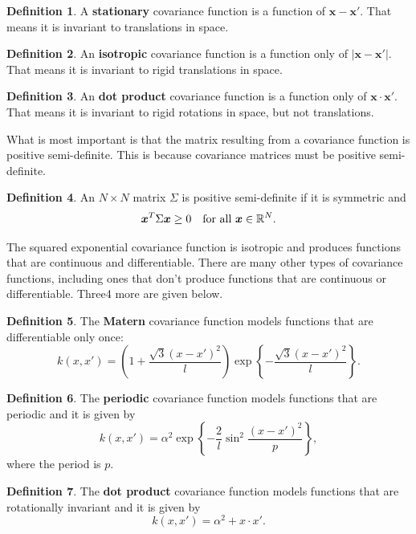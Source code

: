 \documentclass[
]{book}
\theoremstyle{definition}
\newtheorem{definition}{Definition}[chapter]
\theoremstyle{definition}
\theoremstyle{definition}
\theoremstyle{definition}
\theoremstyle{remark}
\begin{document}
\begin{definition}
A \textbf{stationary} covariance function is a function of \(\boldsymbol{x} - \boldsymbol{x}'\). That means it is invariant to translations in space.
\end{definition}

\begin{definition}
An \textbf{isotropic} covariance function is a function only of \(|\boldsymbol{x} - \boldsymbol{x}'|\). That means it is invariant to rigid translations in space.
\end{definition}

\begin{definition}
An \textbf{dot product} covariance function is a function only of \(\boldsymbol{x}\cdot\boldsymbol{x}'\). That means it is invariant to rigid rotations in space, but not translations.
\end{definition}

What is most important is that the matrix resulting from a covariance function is positive semi-definite. This is because covariance matrices must be positive semi-definite.

\begin{definition}
An \(N \times N\) matrix \(\Sigma\) is positive semi-definite if it is symmetric and
\[
\boldsymbol{x}^T\Sigma\boldsymbol{x} \geq 0 \quad \hbox{for all } \boldsymbol{x} \in \mathbb{R}^N.
\]
\end{definition}

The squared exponential covariance function is isotropic and produces functions that are continuous and differentiable. There are many other types of covariance functions, including ones that don't produce functions that are continuous or differentiable. Three4 more are given below.

\begin{definition}
The \textbf{M\textquotesingle atern} covariance function models functions that are differentiable only once:
\[
k(x, x') = \left(1 + \frac{\sqrt{3}(x - x')^2}{l} \right)\exp\left\{-\frac{\sqrt{3}(x - x')^2}{l} \right\}.
\]
\end{definition}

\begin{definition}
The \textbf{periodic} covariance function models functions that are periodic and it is given by
\[
k(x, x') = \alpha^2 \exp\left\{-\frac{2}{l}\sin^2\frac{(x-x')^2}{p} \right\},
\]
where the period is \(p\).
\end{definition}

\begin{definition}
The \textbf{dot product} covariance function models functions that are rotationally invariant and it is given by
\[
k(x, x') = \alpha^2 + x\cdot x'.
\]
\end{definition}
\end{document}
